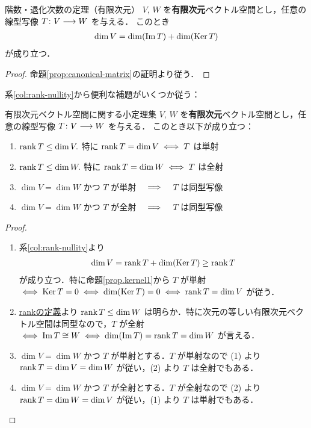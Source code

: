 \documentclass[rep_main]{subfiles}
\begin{document}
\begin{mycol}[label=col:rank-nullity]{階数・退化次数の定理（有限次元）}
	$V,\, W$ を\textbf{有限次元}ベクトル空間とし，任意の線型写像 $T \colon V \longrightarrow W$ を与える．
	このとき
	\begin{align}
		\dim V = \dim (\Im T) + \dim (\operatorname{Ker} T)
	\end{align}
	が成り立つ．
\end{mycol}

\begin{proof}
	命題\ref{prop:canonical-matrix}の証明より従う．
\end{proof}

系\ref{col:rank-nullity}から便利な補題がいくつか従う：

\begin{mylem}[label=lem:finvec-basic]{有限次元ベクトル空間に関する小定理集}
	$V,\, W$ を\textbf{有限次元}ベクトル空間とし，任意の線型写像 $T \colon V \longrightarrow W$ を与える．
	このとき以下が成り立つ：
	\begin{enumerate}
		\item $\rank T \le \dim V.$ 特に $\rank T = \dim V \iff T$ は単射
		\item $\rank T \le \dim W.$ 特に $\rank T = \dim W \iff T$ は全射
		\item $\dim V = \dim W$ かつ $T$ が単射 $\quad \Longrightarrow \quad$ $T$ は同型写像
		\item $\dim V = \dim W$ かつ $T$ が全射 $\quad \Longrightarrow \quad$ $T$ は同型写像
	\end{enumerate}
\end{mylem}

\begin{proof}
	\begin{enumerate}
		\item 系\ref{col:rank-nullity}より
		\begin{align}
			\dim V = \rank T + \dim (\operatorname{Ker} T) \ge \rank T
		\end{align}
		が成り立つ．特に命題\ref{prop.kernel1}から $T$ が単射 $\iff \operatorname{Ker} T = 0 \iff \dim (\operatorname{Ker} T) = 0 \iff \rank T = \dim V$ が従う．
		\item \hyperref[def:rank]{rankの定義}より $\rank T \le \dim W$ は明らか．特に次元の等しい有限次元ベクトル空間は同型なので，$T$ が全射 $\iff \Im T \cong W \iff \dim (\Im T) = \rank T = \dim W$ が言える．
		\item $\dim V = \dim W$ かつ $T$ が単射とする．$T$ が単射なので (1) より $\rank T = \dim V = \dim W$ が従い，(2) より $T$ は全射でもある．
		\item $\dim V = \dim W$ かつ $T$ が全射とする．$T$ が全射なので (2) より $\rank T = \dim W = \dim V$ が従い，(1) より $T$ は単射でもある．
	\end{enumerate}
\end{proof}
\end{document}
